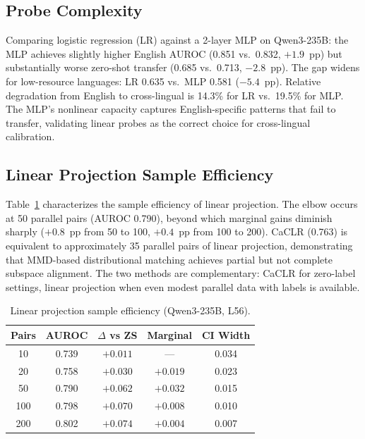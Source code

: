 \documentclass[11pt,a4paper]{article}
\begin{document}
\subsection{Probe Complexity}
\label{sec:probe_complexity}

Comparing logistic regression (LR) against a 2-layer MLP on Qwen3-235B: the MLP achieves slightly higher English AUROC (0.851 vs.\ 0.832, $+1.9$~pp) but substantially worse zero-shot transfer (0.685 vs.\ 0.713, $-2.8$~pp).
The gap widens for low-resource languages: LR 0.635 vs.\ MLP 0.581 ($-5.4$~pp).
Relative degradation from English to cross-lingual is 14.3\% for LR vs.\ 19.5\% for MLP.
The MLP's nonlinear capacity captures English-specific patterns that fail to transfer, validating linear probes as the correct choice for cross-lingual calibration.


\subsection{Linear Projection Sample Efficiency}
\label{sec:linear_proj}

Table~\ref{tab:linproj} characterizes the sample efficiency of linear projection.
The elbow occurs at 50 parallel pairs (AUROC 0.790), beyond which marginal gains diminish sharply ($+0.8$~pp from 50 to 100, $+0.4$~pp from 100 to 200).
CaCLR (0.763) is equivalent to approximately 35 parallel pairs of linear projection, demonstrating that MMD-based distributional matching achieves partial but not complete subspace alignment.
The two methods are complementary: CaCLR for zero-label settings, linear projection when even modest parallel data with labels is available.

\begin{table}[t]
\centering
\caption{Linear projection sample efficiency (Qwen3-235B, L56).}
\label{tab:linproj}
\small
\begin{tabular}{ccccc}
\toprule
\textbf{Pairs} & \textbf{AUROC} & \textbf{$\Delta$ vs ZS} & \textbf{Marginal} & \textbf{CI Width} \\
\midrule
10  & 0.739 & $+0.011$ & --- & 0.034 \\
20  & 0.758 & $+0.030$ & $+0.019$ & 0.023 \\
50  & 0.790 & $+0.062$ & $+0.032$ & 0.015 \\
100 & 0.798 & $+0.070$ & $+0.008$ & 0.010 \\
200 & 0.802 & $+0.074$ & $+0.004$ & 0.007 \\
\bottomrule
\end{tabular}
\end{table}
\end{document}
